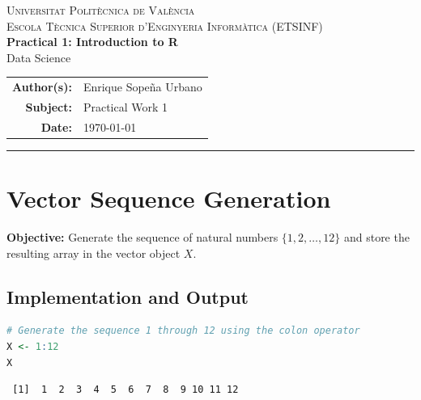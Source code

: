 \documentclass[11pt, a4paper]{article}
\begin{document}
\begin{center}
  {\scshape\large Universitat Politècnica de València}\\[0.2em]
  {\scshape\normalsize Escola Tècnica Superior d'Enginyeria Informàtica (ETSINF)}\\[1.2em]
  {\Large\bfseries Practical 1: Introduction to R}\\[0.4em]
  {\large Data Science}\\[1.2em]
  \begin{tabular}{rl}
    \textbf{Author(s):} & Enrique Sopeña Urbano \\
    \textbf{Subject:}   & Practical Work 1      \\
    \textbf{Date:}      & \today
  \end{tabular}
\end{center}

\vspace{0.8em}
\hrule
\vspace{1.2em}

\begin{abstract}
  \noindent This laboratory report documents the exercises completed for Practical~1 of the Data Science course. The objective is to establish familiarity with the R scientific programming environment, covering primitive vector manipulation, cyclic repetitions, matrix construction, pseudorandom generation under controlled seed states, data frame ingestion, frequency cross-tabulations, conditional partitioning, and graphical bivariate inspection.
\end{abstract}

\vspace{1em}

\section{Vector Sequence Generation}
\textbf{Objective:} Generate the sequence of natural numbers $\{1, 2, \dots, 12\}$ and store the resulting array in the vector object $X$.

\subsection{Implementation and Output}
\begin{lstlisting}[language=R]
# Generate the sequence 1 through 12 using the colon operator
X <- 1:12
X
\end{lstlisting}

\begin{lstlisting}
 [1]  1  2  3  4  5  6  7  8  9 10 11 12
\end{lstlisting}
\end{document}
